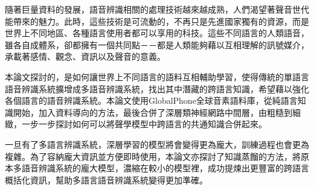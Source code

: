 \begin{zhAbstract}  %
隨著巨量資料的發展，語音辨識相關的處理技術越來越成熟，人們渴望著聲音世代能帶來的魅力。此時，這些技術是可流動的，不再只是先進國家獨有的資源，而是世界上不同地區、各種語言使用者都可以享用的科技。這些不同語言的人類語音，雖各自成體系，卻都擁有一個共同點－－都是人類能夠藉以互相理解的訊號媒介，承載著感情、觀念、資訊以及聲音的意義。

本論文探討的，是如何讓世界上不同語言的語料互相輔助學習，使得傳統的單語言語音辨識系統擴增成多語音辨識系統，找出其中潛藏的跨語言知識，希望藉以強化各個語言的語音辨識系統。本論文使用GlobalPhone全球音素語料庫，從純語言知識開始，加入資料導向的方法，最後合併了深層類神經網路中間層，由粗糙到細緻，一步一步探討如何可以將聲學模型中跨語言的共通知識合併起來。

一旦有了多語言辨識系統，深層學習的模型將會變得更為龐大，訓練過程也會更為複雜。為了容納龐大資訊並方便即時使用，本論文亦探討了知識蒸餾的方法，將原本多語音辨識系統的龐大模型，濃縮在較小的模型裡，成功提煉出更豐富的跨語言概括化資訊，幫助多語言語音辨識系統變得更加準確。

\end{zhAbstract}

{
\mysinglespacing\selectfont
\tableofcontents %

\listoffigures  %

\listoftables  %
\par
}

\newpage
\setcounter{page}{1}
